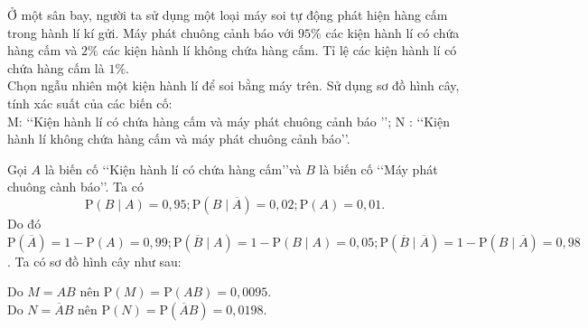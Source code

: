 \begin{vd}%
	Ở một sân bay, người ta sử dụng một loại máy soi tự động phát hiện hàng cấm trong hành lí kí gửi. Máy phát chuông cảnh báo với $95 \%$ các kiện hành lí có chứa hàng cấm và $2 \%$ các kiện hành lí không chứa hàng cấm. Tỉ lệ các kiện hành lí có chứa hàng cấm là $1 \%$.\\
	Chọn ngẫu nhiên một kiện hành lí để soi bằng máy trên. Sử dụng sơ đồ hình cây, tính xác suất của các biến cố:\\
	M: \lq\lq Kiện hành lí có chứa hàng cấm và máy phát chuông cảnh báo \rq\rq;
	N : \lq\lq Kiện hành lí không chứa hàng cấm và máy phát chuông cảnh báo\rq\rq.
	\loigiai
	{
		Gọi $A$ là biến cố \lq\lq Kiện hành lí có chứa hàng cấm\rq\rq và $B$ là biến cố \lq\lq Máy phát chuông cành báo\rq\rq. Ta có
		$$
		\mathrm{P}(B \mid A)=0{,}95 ; \mathrm{P}(B \mid \overline{A})=0{,}02 ; \mathrm{P}(A)=0{,}01.
		$$
		Do đó $\mathrm{P}(\overline{A})=1-\mathrm{P}(A)=0{,}99 ; \mathrm{P}(\overline{B} \mid A)=1-\mathrm{P}(B \mid A)=0{,}05 ; \mathrm{P}(\overline{B} \mid \overline{A})=1-\mathrm{P}(B \mid \overline{A})=0{,}98$.
		Ta có sơ đồ hình cây như sau:
		\begin{center}
		\end{center}
		Do $M=A B$ nên $\mathrm{P}(M)=\mathrm{P}(A B)=0{,}0095$.\\
		Do $N=\overline{A} B$ nên $\mathrm{P}(N)=\mathrm{P}(\overline{A} B)=0{,}0198$.
	}
\end{vd}

